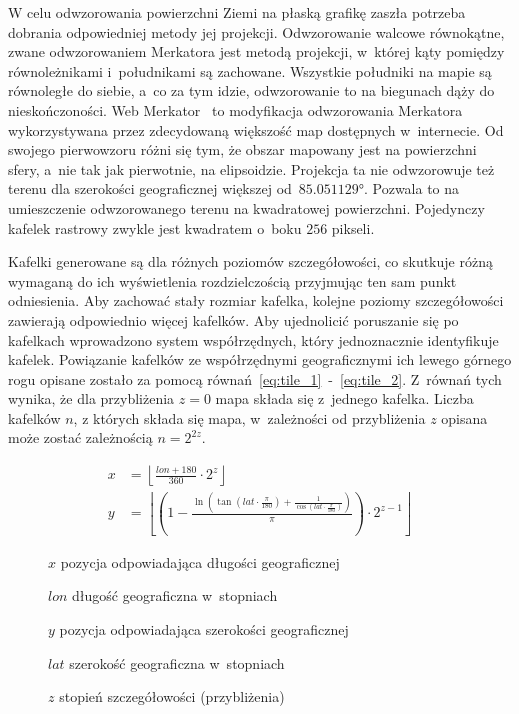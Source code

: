 W celu odwzorowania powierzchni Ziemi na płaską grafikę zaszła potrzeba dobrania odpowiedniej metody jej projekcji. Odwzorowanie walcowe równokątne, zwane odwzorowaniem Merkatora jest metodą projekcji, w~której kąty pomiędzy równoleżnikami i~południkami są zachowane. Wszystkie południki na mapie są równoległe do siebie, a~co za tym idzie, odwzorowanie to na biegunach dąży do nieskończoności. Web Merkator~\cite{Mercator} to modyfikacja odwzorowania Merkatora wykorzystywana przez zdecydowaną większość map dostępnych w~internecie. Od swojego pierwowzoru różni się tym, że obszar mapowany jest na powierzchni sfery, a~nie tak jak pierwotnie, na elipsoidzie. Projekcja ta nie odwzorowuje też terenu dla szerokości geograficznej większej od~$\ang{85.051129}$. Pozwala to na umieszczenie odwzorowanego terenu na kwadratowej powierzchni. Pojedynczy kafelek rastrowy zwykle jest kwadratem o~boku $256$ pikseli.

Kafelki generowane są dla różnych poziomów szczegółowości, co skutkuje różną wymaganą do ich wyświetlenia rozdzielczością przyjmując ten sam punkt odniesienia. Aby zachować stały rozmiar kafelka, kolejne poziomy szczegółowości zawierają odpowiednio więcej kafelków. Aby ujednolicić poruszanie się po kafelkach wprowadzono system współrzędnych, który jednoznacznie identyfikuje kafelek. Powiązanie kafelków ze współrzędnymi geograficznymi ich lewego górnego rogu opisane zostało za pomocą równań~\ref{eq:tile_1}~-~\ref{eq:tile_2}. Z~równań tych wynika, że dla przybliżenia $z = 0$ mapa składa się z~jednego kafelka. Liczba kafelków $n$, z których składa się mapa, w~zależności od przybliżenia $z$ opisana może zostać zależnością $n = 2^{2z}$.

\begin{samepage}
  \begin{figure}[h]
  \begin{align}
      \label{eq:tile_1}
      x &= \left\lfloor \frac{lon + 180}{360} \cdot 2^z \right\rfloor \\
      \label{eq:tile_2}
      y &=
          \left\lfloor
              \left(
                  1 - \frac{
                      \ln \left(
                          \tan \left(
                              lat \cdot \frac{\pi}{180}
                          \right) + \frac{1}{\cos \left( lat \cdot \frac{\pi}{180} \right)}
                      \right)
                  }{\pi}
              \right) \cdot 2^{z - 1}
          \right\rfloor
  \end{align}
  \begin{eqexpl}[25mm]
      \item {$x$} pozycja odpowiadająca długości geograficznej
      \item {$lon$} długość geograficzna w~stopniach
      \item {$y$} pozycja odpowiadająca szerokości geograficznej
      \item {$lat$} szerokość geograficzna w~stopniach
      \item {$z$} stopień szczegółowości (przybliżenia)
  \end{eqexpl}
  \vspace{\baselineskip}
\end{figure}
\end{samepage}

